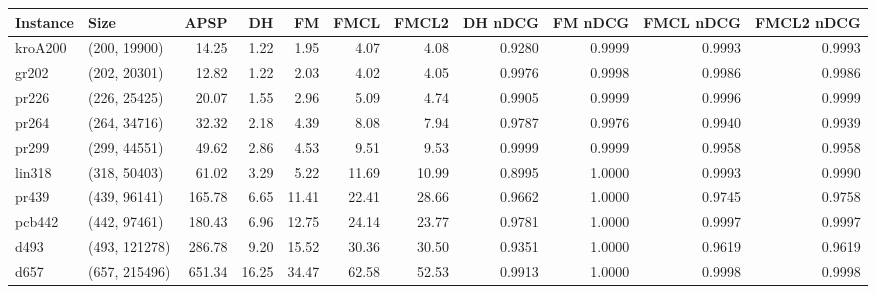 \begin{tabular}{llrrrrrrrrr}
\toprule
Instance &          Size &   APSP &    DH &    FM &  FMCL &  FMCL2 &  DH nDCG &  FM nDCG &  FMCL nDCG &  FMCL2 nDCG \\
\midrule
 kroA200 &  (200, 19900) &  14.25 &  1.22 &  1.95 &  4.07 &   4.08 &   0.9280 &   0.9999 &     0.9993 &      0.9993 \\
   gr202 &  (202, 20301) &  12.82 &  1.22 &  2.03 &  4.02 &   4.05 &   0.9976 &   0.9998 &     0.9986 &      0.9986 \\
   pr226 &  (226, 25425) &  20.07 &  1.55 &  2.96 &  5.09 &   4.74 &   0.9905 &   0.9999 &     0.9996 &      0.9999 \\
   pr264 &  (264, 34716) &  32.32 &  2.18 &  4.39 &  8.08 &   7.94 &   0.9787 &   0.9976 &     0.9940 &      0.9939 \\
   pr299 &  (299, 44551) &  49.62 &  2.86 &  4.53 &  9.51 &   9.53 &   0.9999 &   0.9999 &     0.9958 &      0.9958 \\
  lin318 &  (318, 50403) &  61.02 &  3.29 &  5.22 & 11.69 &  10.99 &   0.8995 &   1.0000 &     0.9993 &      0.9990 \\
   pr439 &  (439, 96141) & 165.78 &  6.65 & 11.41 & 22.41 &  28.66 &   0.9662 &   1.0000 &     0.9745 &      0.9758 \\
  pcb442 &  (442, 97461) & 180.43 &  6.96 & 12.75 & 24.14 &  23.77 &   0.9781 &   1.0000 &     0.9997 &      0.9997 \\
    d493 & (493, 121278) & 286.78 &  9.20 & 15.52 & 30.36 &  30.50 &   0.9351 &   1.0000 &     0.9619 &      0.9619 \\
    d657 & (657, 215496) & 651.34 & 16.25 & 34.47 & 62.58 &  52.53 &   0.9913 &   1.0000 &     0.9998 &      0.9998 \\
\bottomrule
\end{tabular}
